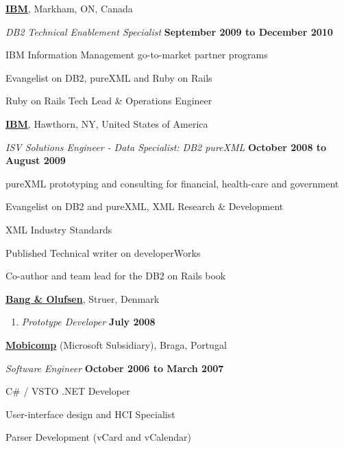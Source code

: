 \documentclass[10pt]{article}
\newenvironment{outerlist}[1][\enskip\textbullet]%
        {\begin{enumerate}[#1]}{\end{enumerate}%
         \vspace{-.6\baselineskip}}
\newenvironment{innerlist}[1][\enskip\textbullet]%
        {\begin{compactenum}[#1]}{\end{compactenum}}
\newcommand{\blankline}{\quad\pagebreak[2]}
\begin{document}
\blankline

\href{http://www.ibm.com/}{\textbf{IBM}}, 
Markham, ON, Canada
\begin{outerlist}

  \item[] \textit{DB2 Technical Enablement Specialist}%
          \hfill \textbf{September 2009 to December 2010}
  \begin{innerlist}
\item IBM Information Management go-to-market partner programs
\item Evangelist on DB2, pureXML and Ruby on Rails
\item Ruby on Rails Tech Lead \& Operations Engineer
  \end{innerlist}

\end{outerlist}

\blankline

\href{http://www.ibm.com/}{\textbf{IBM}}, 
Hawthorn, NY, United States of America
\begin{outerlist}

  \item[] \textit{ISV Solutions Engineer - Data Specialist: DB2 pureXML}%
          \hfill \textbf{October 2008 to August 2009}
  \begin{innerlist}
\item pureXML prototyping and consulting for financial, health-care and government
\item Evangelist on DB2 and pureXML, XML Research \& Development
\item XML Industry Standards
\item Published Technical writer on developerWorks
\item Co-author and team lead for the DB2 on Rails book
  \end{innerlist}

\end{outerlist}

\blankline

\href{http://www.bang-olufsen.com}{\textbf{Bang \& Olufsen}}, 
Struer, Denmark
\begin{outerlist}

\item[] \textit{Prototype Developer}%
        \hfill \textbf{July 2008}

\end{outerlist}

\blankline

\href{http://www.mobicomp.com/}{\textbf{Mobicomp}} (Microsoft Subsidiary), 
Braga, Portugal
\begin{outerlist}

\item[] \textit{Software Engineer}%
        \hfill \textbf{October 2006 to March 2007}
\begin{innerlist}
\item C\# / VSTO .NET Developer
\item User-interface design and HCI Specialist
\item Parser Development (vCard and vCalendar)
\end{innerlist}

\end{outerlist}
\end{document}
